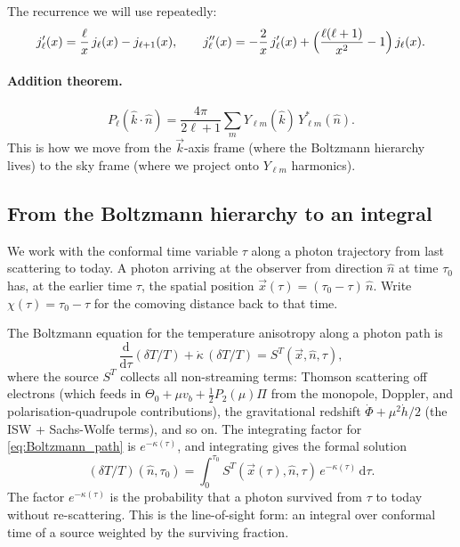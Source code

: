 The recurrence we will use repeatedly:
\begin{equation}
  j_\ell'(x) = \frac{\ell}{x}\, j_\ell(x) - j_{\ell + 1}(x),
  \qquad
  j_\ell''(x) = -\frac{2}{x}\, j_\ell'(x) + \Bigl(\frac{\ell(\ell+1)}{x^2} - 1\Bigr)\, j_\ell(x).
  \label{eq:jl_recurrence}
\end{equation}

\paragraph{Addition theorem.}
\[
  P_\ell(\hat k \cdot \hat n) = \frac{4\pi}{2\ell + 1}\sum_m Y_{\ell m}(\hat k)\, Y^*_{\ell m}(\hat n).
\]
This is how we move from the $\vec k$-axis frame (where the Boltzmann hierarchy lives) to the sky frame (where we project onto $Y_{\ell m}$ harmonics).

\subsection{From the Boltzmann hierarchy to an integral}

We work with the conformal time variable $\tau$ along a photon trajectory from last scattering to today. A photon arriving at the observer from direction $\hat n$ at time $\tau_0$ has, at the earlier time $\tau$, the spatial position $\vec x(\tau) = (\tau_0 - \tau)\,\hat n$. Write $\chi(\tau) = \tau_0 - \tau$ for the comoving distance back to that time.

The Boltzmann equation for the temperature anisotropy along a photon path is
\begin{equation}
  \frac{\mathrm{d}}{\mathrm{d}\tau}(\delta T/T) + \dot\kappa\,(\delta T/T) = S^T(\vec x, \hat n, \tau),
  \label{eq:Boltzmann_path}
\end{equation}
where the source $S^T$ collects all non-streaming terms: Thomson scattering off electrons (which feeds in $\Theta_0 + \mu v_b + \tfrac{1}{2}P_2(\mu)\Pi$ from the monopole, Doppler, and polarisation-quadrupole contributions), the gravitational redshift $\dot\Phi + \mu^2\dot h/2$ (the ISW + Sachs-Wolfe terms), and so on. The integrating factor for \cref{eq:Boltzmann_path} is $e^{-\kappa(\tau)}$, and integrating gives the formal solution
\begin{equation}
  (\delta T/T)(\hat n, \tau_0) = \int_0^{\tau_0} S^T(\vec x(\tau), \hat n, \tau)\, e^{-\kappa(\tau)}\,\mathrm{d}\tau.
  \label{eq:LOS_path}
\end{equation}
The factor $e^{-\kappa(\tau)}$ is the probability that a photon survived from $\tau$ to today without re-scattering. This is the line-of-sight form: an integral over conformal time of a source weighted by the surviving fraction.

